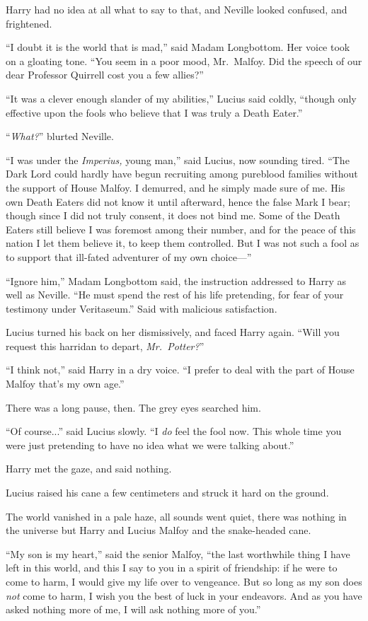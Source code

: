 Harry had no idea at all what to say to that, and Neville looked confused, and frightened.

“I doubt it is the world that is mad,” said Madam Longbottom. Her voice took on a gloating tone. “You seem in a poor mood, Mr.~Malfoy. Did the speech of our dear Professor Quirrell cost you a few allies?”

“It was a clever enough slander of my abilities,” Lucius said coldly, “though only effective upon the fools who believe that I was truly a Death Eater.”

“\emph{What?}” blurted Neville.

“I was under the \emph{Imperius,} young man,” said Lucius, now sounding tired. “The Dark Lord could hardly have begun recruiting among pureblood families without the support of House Malfoy. I demurred, and he simply made sure of me. His own Death Eaters did not know it until afterward, hence the false Mark I bear; though since I did not truly consent, it does not bind me. Some of the Death Eaters still believe I was foremost among their number, and for the peace of this nation I let them believe it, to keep them controlled. But I was not such a fool as to support that ill-fated adventurer of my own choice—”

“Ignore him,” Madam Longbottom said, the instruction addressed to Harry as well as Neville. “He must spend the rest of his life pretending, for fear of your testimony under Veritaseum.” Said with malicious satisfaction.

Lucius turned his back on her dismissively, and faced Harry again. “Will you request this harridan to depart, \emph{Mr.~Potter?}”

“I think not,” said Harry in a dry voice. “I prefer to deal with the part of House Malfoy that’s my own age.”

There was a long pause, then. The grey eyes searched him.

“Of course...” said Lucius slowly. “I \emph{do} feel the fool now. This whole time you were just pretending to have no idea what we were talking about.”

Harry met the gaze, and said nothing.

Lucius raised his cane a few centimeters and struck it hard on the ground.

The world vanished in a pale haze, all sounds went quiet, there was nothing in the universe but Harry and Lucius Malfoy and the snake-headed cane.

“My son is my heart,” said the senior Malfoy, “the last worthwhile thing I have left in this world, and this I say to you in a spirit of friendship: if he were to come to harm, I would give my life over to vengeance. But so long as my son does \emph{not} come to harm, I wish you the best of luck in your endeavors. And as you have asked nothing more of me, I will ask nothing more of you.”

